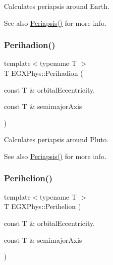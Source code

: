 Calculates periapsis around Earth. 

\begin{DoxySeeAlso}{See also}
\mbox{\hyperlink{group___e_g_x_phys-_periapsis_ga4414ac75539371ec874a3d25cad6c9fe}{Periapsis()}} for more info. 
\end{DoxySeeAlso}
\mbox{\label{group___e_g_x_phys-_periapsis_gafb16e46e55078b38604eef0d7c7c40c4}} 
\subsubsection{\texorpdfstring{Perihadion()}{Perihadion()}}
{\footnotesize\ttfamily template$<$typename T $>$ \\
T E\+G\+X\+Phys\+::\+Perihadion (\begin{DoxyParamCaption}\item[{const T \&}]{orbital\+Eccentricity,  }\item[{const T \&}]{semimajor\+Axis }\end{DoxyParamCaption})}



Calculates periapsis around Pluto. 

\begin{DoxySeeAlso}{See also}
\mbox{\hyperlink{group___e_g_x_phys-_periapsis_ga4414ac75539371ec874a3d25cad6c9fe}{Periapsis()}} for more info. 
\end{DoxySeeAlso}
\mbox{\label{group___e_g_x_phys-_periapsis_ga941d285e3a0b48ada9c9f60925ff63c2}} 
\subsubsection{\texorpdfstring{Perihelion()}{Perihelion()}}
{\footnotesize\ttfamily template$<$typename T $>$ \\
T E\+G\+X\+Phys\+::\+Perihelion (\begin{DoxyParamCaption}\item[{const T \&}]{orbital\+Eccentricity,  }\item[{const T \&}]{semimajor\+Axis }\end{DoxyParamCaption})}



